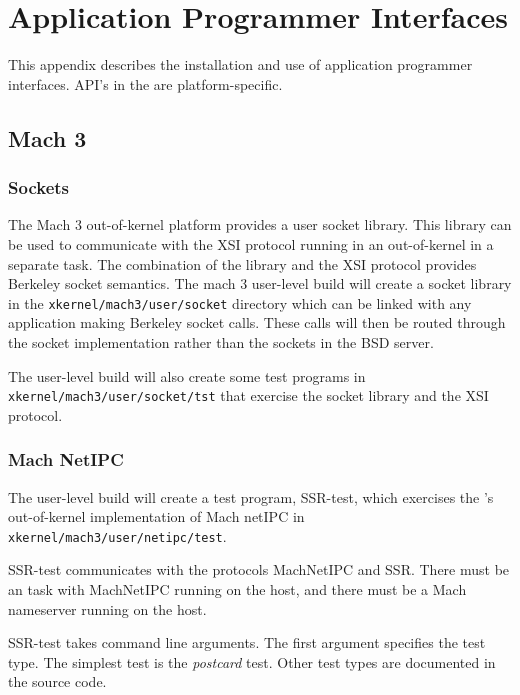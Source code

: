 % 
%
%

\section{Application Programmer Interfaces}
\label{api}

This appendix describes the installation and use of \xk{} application
programmer interfaces.  API's in the \xk{} are platform-specific.


\subsection{ Mach 3 }

\subsubsection{Sockets}

The Mach 3 out-of-kernel platform provides a user socket library.
This library can be used to communicate with the XSI protocol
running in an out-of-kernel \xk{} in a separate task.
The combination of the library and the XSI protocol 
provides Berkeley socket semantics.  The mach 3 user-level build
will create a socket library in the {\tt xkernel/mach3/user/socket}
directory which can be linked with any application making Berkeley
socket calls.  These calls will then be routed through the \xk{}
socket implementation rather than the sockets in the BSD server.

The user-level build will also create some test programs in 
{\tt xkernel/mach3/user/socket/tst} that exercise the socket library
and the XSI protocol.

\subsubsection{Mach NetIPC}

The user-level build will create a test program, SSR-test, 
which exercises the \xk{}'s
out-of-kernel implementation of Mach netIPC in
{\tt xkernel/mach3/user/netipc/test}.

SSR-test communicates with the \xk{} protocols MachNetIPC and SSR.  
There must be an \xk{}
task with MachNetIPC running on the host, and there must be a 
Mach nameserver running on the host.

SSR-test takes command line arguments.  The first argument specifies
the test type.  The simplest test is the {\em postcard} test.  Other
test types are documented in the source code.


